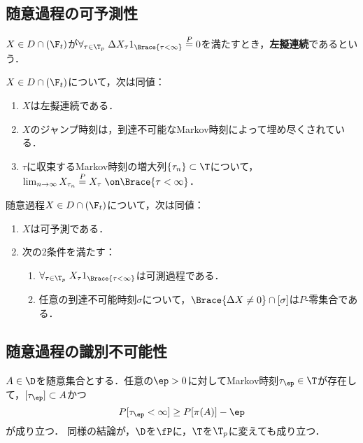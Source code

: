 \documentclass[uplatex,dvipdfmx]{jsreport}
\begin{document}
\subsection{随意過程の可予測性}

\begin{definition}
    $X\in D\cap(\F_t)$が$\forall_{\tau\in\T_p}\;\Delta X_\tau 1_{\Brace{\tau<\infty}}\overset{P}{=}0$を満たすとき，\textbf{左擬連続}であるという．
\end{definition}

\begin{theorem}
    $X\in D\cap(\F_t)$について，次は同値：
    \begin{enumerate}
        \item $X$は左擬連続である．
        \item $X$のジャンプ時刻は，到達不可能なMarkov時刻によって埋め尽くされている．
        \item $\tau$に収束するMarkov時刻の増大列$\{\tau_n\}\subset\T$について，$\lim_{n\to\infty}X_{\tau_n}\overset{P}{=}X_\tau\;\on\Brace{\tau<\infty}$．
    \end{enumerate}
\end{theorem}

\begin{theorem}
    随意過程$X\in D\cap(\F_t)$について，次は同値：
    \begin{enumerate}
        \item $X$は可予測である．
        \item 次の2条件を満たす：
        \begin{enumerate}
            \item $\forall_{\tau\in\T_p}\;X_\tau1_{\Brace{\tau<\infty}}$は可測過程である．
            \item 任意の到達不可能時刻$\sigma$について，$\Brace{\Delta X\ne0}\cap[\sigma]$は$P$-零集合である．
        \end{enumerate}
    \end{enumerate}
\end{theorem}

\subsection{随意過程の識別不可能性}

\begin{theorem}
    $A\in\D$を随意集合とする．任意の$\ep>0$に対してMarkov時刻$\tau_\ep\in\T$が存在して，$[\tau_\ep]\subset A$かつ
    \[P[\tau_\ep<\infty]\ge P[\pi(A)]-\ep\]
    が成り立つ．
    同様の結論が，$\D$を$\fP$に，$\T$を$\T_p$に変えても成り立つ．
\end{theorem}
\end{document}
